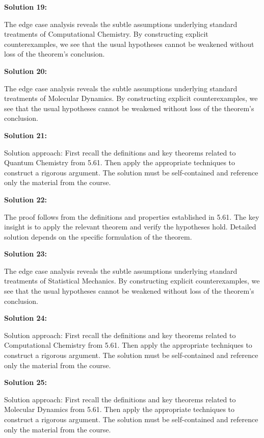 \documentclass[12pt,a4paper]{exam}
\begin{document}
\vspace{0.5cm}

\textbf{Solution 19:}

The edge case analysis reveals the subtle assumptions underlying standard treatments of Computational Chemistry. By constructing explicit counterexamples, we see that the usual hypotheses cannot be weakened without loss of the theorem's conclusion.

\vspace{0.5cm}

\textbf{Solution 20:}

The edge case analysis reveals the subtle assumptions underlying standard treatments of Molecular Dynamics. By constructing explicit counterexamples, we see that the usual hypotheses cannot be weakened without loss of the theorem's conclusion.

\vspace{0.5cm}

\textbf{Solution 21:}

Solution approach: First recall the definitions and key theorems related to Quantum Chemistry from 5.61. Then apply the appropriate techniques to construct a rigorous argument. The solution must be self-contained and reference only the material from the course.

\vspace{0.5cm}

\textbf{Solution 22:}

The proof follows from the definitions and properties established in 5.61. The key insight is to apply the relevant theorem and verify the hypotheses hold. Detailed solution depends on the specific formulation of the theorem.

\vspace{0.5cm}

\textbf{Solution 23:}

The edge case analysis reveals the subtle assumptions underlying standard treatments of Statistical Mechanics. By constructing explicit counterexamples, we see that the usual hypotheses cannot be weakened without loss of the theorem's conclusion.

\vspace{0.5cm}

\textbf{Solution 24:}

Solution approach: First recall the definitions and key theorems related to Computational Chemistry from 5.61. Then apply the appropriate techniques to construct a rigorous argument. The solution must be self-contained and reference only the material from the course.

\vspace{0.5cm}

\textbf{Solution 25:}

Solution approach: First recall the definitions and key theorems related to Molecular Dynamics from 5.61. Then apply the appropriate techniques to construct a rigorous argument. The solution must be self-contained and reference only the material from the course.

\vspace{0.5cm}
\end{document}
